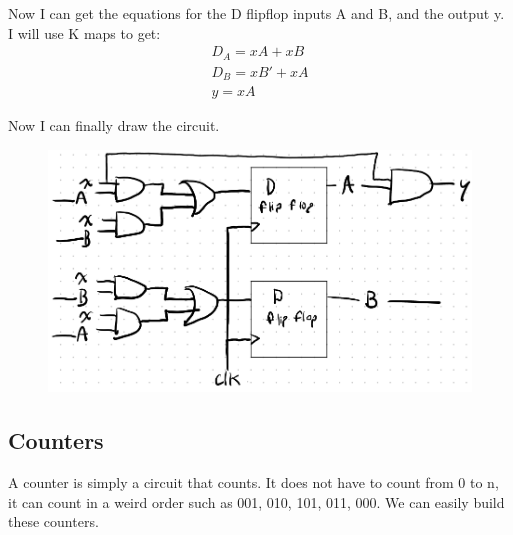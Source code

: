 \documentclass[12pt,letterpaper]{article} \usepackage{amsmath} \usepackage{graphicx}  \usepackage{longtable}  \usepackage{amssymb}
\begin{document}
\begin{mdframed}
            Now I can get the equations for the D flipflop inputs A and B, and the output y. I will use K maps to get:
            \begin{align*}
                D_A = xA + xB\\
                D_B = xB' + xA\\
                y = xA
            \end{align*}

            Now I can finally draw the circuit. 
            \begin{figure}[H]
                \centering
                \includegraphics[width=0.8\linewidth]{ex9-4.png}
            \end{figure}
        \end{mdframed}

        \subsection{Counters}
        A counter is simply a circuit that counts. It does not have to count from 0 to n, it can count in a weird order such as 001, 010, 101, 011, 000. We can easily build these counters. 
\end{document}

